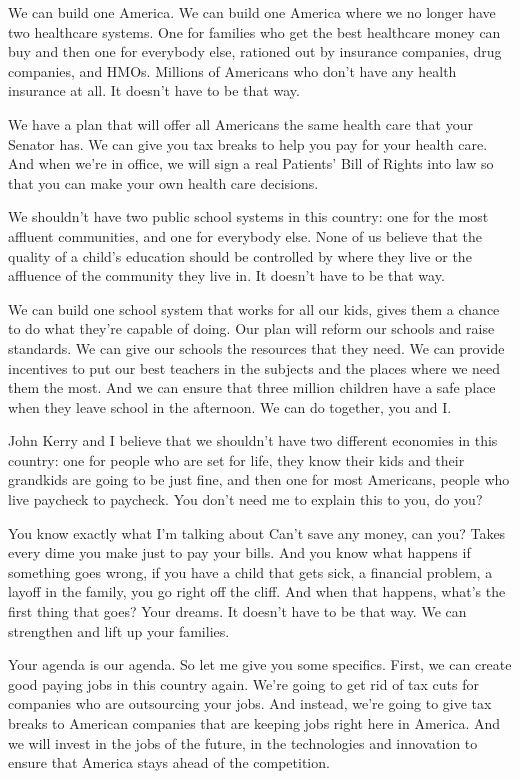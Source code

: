 We can build one America. We can build one America where we no longer
have two healthcare systems. One for families who get the best
healthcare money can buy and then one for everybody else, rationed out
by insurance companies, drug companies, and HMOs. Millions of Americans
who don't have any health insurance at all. It doesn't have to be that
way.

We have a plan that will offer all Americans the same health care that
your Senator has. We can give you tax breaks to help you pay for your
health care. And when we're in office, we will sign a real Patients'
Bill of Rights into law so that you can make your own health care
decisions.

We shouldn't have two public school systems in this country: one for the
most affluent communities, and one for everybody else. None of us
believe that the quality of a child's education should be controlled by
where they live or the affluence of the community they live in. It
doesn't have to be that way.

We can build one school system that works for all our kids, gives them a
chance to do what they're capable of doing. Our plan will reform our
schools and raise standards. We can give our schools the resources that
they need. We can provide incentives to put our best teachers in the
subjects and the places where we need them the most. And we can ensure
that three million children have a safe place when they leave school in
the afternoon. We can do together, you and I.

John Kerry and I believe that we shouldn't have two different economies
in this country: one for people who are set for life, they know their
kids and their grandkids are going to be just fine, and then one for
most Americans, people who live paycheck to paycheck. You don't need me
to explain this to you, do you?

You know exactly what I'm talking about Can't save any money, can you?
Takes every dime you make just to pay your bills. And you know what
happens if something goes wrong, if you have a child that gets sick, a
financial problem, a layoff in the family, you go right off the cliff.
And when that happens, what's the first thing that goes? Your dreams. It
doesn't have to be that way. We can strengthen and lift up your
families.

Your agenda is our agenda. So let me give you some specifics. First, we
can create good paying jobs in this country again. We're going to get
rid of tax cuts for companies who are outsourcing your jobs. And
instead, we're going to give tax breaks to American companies that are
keeping jobs right here in America. And we will invest in the jobs of
the future, in the technologies and innovation to ensure that America
stays ahead of the competition.

